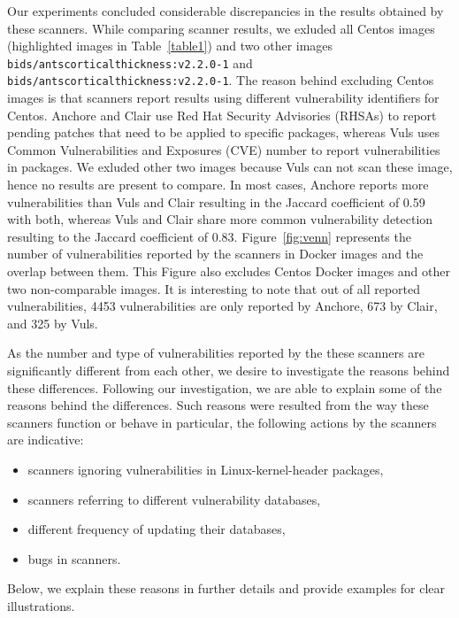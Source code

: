 \documentclass[a4paper,num-refs]{oup-contemporary}
\begin{document}
Our experiments concluded considerable discrepancies in the results obtained by
these scanners. %
While comparing scanner results, we exluded all Centos images (highlighted images in Table~\ref{table1})
and two other images \texttt{bids/antscorticalthickness:v2.2.0-1} and
\texttt{bids/antscorticalthickness:v2.2.0-1}. The reason behind excluding Centos images is that scanners report results using different
vulnerability identifiers for Centos. Anchore and Clair use Red Hat Security Advisories (RHSAs)
to report pending patches that need to be applied to specific packages,
whereas Vuls uses Common Vulnerabilities and Exposures (CVE) number to report
vulnerabilities in packages. We exluded other two images because Vuls
can not scan these image, hence no results are present to compare.
In most cases,
Anchore reports more vulnerabilities than Vuls and Clair resulting in 
the Jaccard coefficient of 0.59 with both,
whereas Vuls and Clair share more common vulnerability detection resulting to the Jaccard coefficient of 0.83.
Figure~\ref{fig:venn} represents the number of vulnerabilities reported by
the scanners in Docker images and the overlap between them.
This Figure also excludes Centos Docker images and other two non-comparable images.
It is interesting to note that out of all reported vulnerabilities, 4453 vulnerabilities are only
reported by Anchore, 673 by Clair, and 325 by Vuls.

As the number and type of vulnerabilities reported by the these scanners are significantly different from each other,
we desire to investigate the reasons behind these differences.
Following our investigation, we are able to explain some of the reasons behind
the differences. 
Such reasons were resulted from the way these scanners function or behave 
in particular, the following actions by the scanners are indicative:
\begin{itemize}
   \item scanners ignoring vulnerabilities in Linux-kernel-header packages,
   \item scanners referring to different vulnerability databases,
   \item different frequency of updating their databases,
   \item bugs in scanners. 
\end{itemize}

Below, we explain these reasons in further details and provide examples
for clear illustrations.
\end{document}
